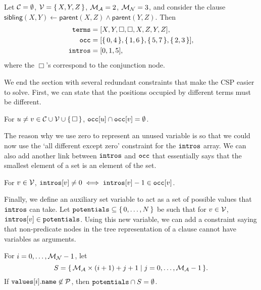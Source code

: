 \begin{example}\label{example:sibling}
  Let $\mathcal{C}{} = \emptyset$, $\mathcal{V}{} = \{\, X, Y, Z \,\}$,
  $\mathcal{M}_{\mathcal{A}}{} = 2$, $\mathcal{M}_{\mathcal{N}}{} = 3$, and consider the clause
  $\mathsf{sibling}(X, Y) \gets \mathsf{parent}(X, Z) \land \mathsf{parent}(Y, Z)$.
  Then
  \begin{align*}
    \texttt{\textup{terms}} &= [X, Y, \Box, \Box, X, Z, Y, Z], \\
    \texttt{\textup{occ}} &= [\{\, 0, 4 \,\}, \{\, 1, 6 \,\}, \{\, 5, 7 \,\}, \{\, 2, 3 \,\}], \\
    \texttt{\textup{intros}} &= [0, 1, 5],
  \end{align*}
  where the $\Box$'s correspond to the conjunction node.
\end{example}

We end the section with several redundant constraints that make the CSP easier
to solve. First, we can state that the positions occupied by different terms
must be different.
\begin{constraint}\label{constraint:all_diff}
  For $u \ne v \in \mathcal{C}{} \cup \mathcal{V}{} \cup \{\, \Box \,\}$,
  $\texttt{\textup{occ}}[u] \cap \texttt{\textup{occ}}[v] = \emptyset$.
\end{constraint}
The reason why we use zero to represent an unused variable is so that we could
now use the `all different except zero' constraint for the $\texttt{\textup{intros}}$
array. We can also add another link between $\texttt{\textup{intros}}$ and
$\texttt{\textup{occ}}$ that essentially says that the smallest element of a set is an
element of the set.
\begin{constraint}
  For $v \in \mathcal{V}{}$, $\texttt{\textup{intros}}[v] \ne 0 \iff
  \texttt{\textup{intros}}[v] - 1 \in \texttt{\textup{occ}}[v]$.
\end{constraint}
Finally, we define an auxiliary set variable to act as a set of possible values
that $\texttt{\textup{intros}}$ can take. Let
$\texttt{\textup{potentials}} \subseteq \{\, 0, \dots, N \,\}$ be such that for
$v \in \mathcal{V}{}$, $\texttt{\textup{intros}}[v] \in \texttt{\textup{potentials}}$. Using
this new variable, we can add a constraint saying that non-predicate nodes in
the tree representation of a clause cannot have variables as arguments.
\begin{constraint}\label{constraint:potentialIntroductions}
  For $i = 0, \dots, \mathcal{M}_{\mathcal{N}}{} - 1$, let
  \[
    S = \{\, \mathcal{M}_{\mathcal{A}}{} \times (i + 1) + j + 1 \mid j = 0, \dots, \mathcal{M}_{\mathcal{A}}{} - 1 \,\}.
  \]
  If $\texttt{\textup{values}}[i].\texttt{\textup{name}} \not\in \mathcal{P}{}$, then
  $\texttt{\textup{potentials}} \cap S = \emptyset$.
\end{constraint}

